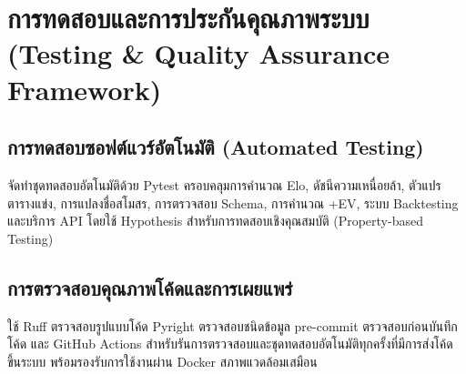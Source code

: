 \section{การทดสอบและการประกันคุณภาพระบบ (Testing \& Quality Assurance Framework)}

\subsection{การทดสอบซอฟต์แวร์อัตโนมัติ (Automated Testing)}
จัดทำชุดทดสอบอัตโนมัติด้วย Pytest ครอบคลุมการคำนวณ Elo, ดัชนีความเหนื่อยล้า, ตัวแปรตารางแข่ง, การแปลงชื่อสโมสร, การตรวจสอบ Schema, การคำนวณ +EV, ระบบ Backtesting และบริการ API โดยใช้ Hypothesis สำหรับการทดสอบเชิงคุณสมบัติ (Property-based Testing)

\subsection{การตรวจสอบคุณภาพโค้ดและการเผยแพร่}
ใช้ Ruff ตรวจสอบรูปแบบโค้ด Pyright ตรวจสอบชนิดข้อมูล pre-commit ตรวจสอบก่อนบันทึกโค้ด และ GitHub Actions สำหรับรันการตรวจสอบและชุดทดสอบอัตโนมัติทุกครั้งที่มีการส่งโค้ดขึ้นระบบ พร้อมรองรับการใช้งานผ่าน Docker สภาพแวดล้อมเสมือน